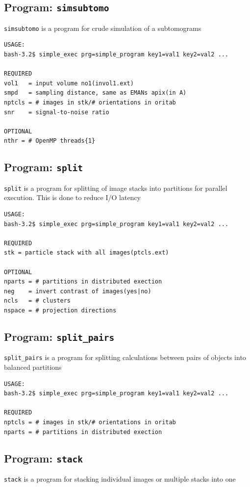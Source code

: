 \documentclass[a4paper,11pt]{article}
\newcommand{\prgname}[1]{\textcolor{NavyBlue}{\texttt{#1}}}
\begin{document}
\subsection{Program: \prgname{simsubtomo}}
\label{simsubtomo}
\prgname{simsubtomo} is a program for crude simulation of a subtomograms

\begin{verbatim}
USAGE:
bash-3.2$ simple_exec prg=simple_program key1=val1 key2=val2 ...

REQUIRED
vol1   = input volume no1(invol1.ext)
smpd   = sampling distance, same as EMANs apix(in A)
nptcls = # images in stk/# orientations in oritab
snr    = signal-to-noise ratio

OPTIONAL
nthr = # OpenMP threads{1}
\end{verbatim}

\subsection{Program: \prgname{split}}
\label{split}
\prgname{split} is a program for splitting of image stacks into partitions for parallel execution. This is done to reduce I/O latency

\begin{verbatim}
USAGE:
bash-3.2$ simple_exec prg=simple_program key1=val1 key2=val2 ...

REQUIRED
stk = particle stack with all images(ptcls.ext)

OPTIONAL
nparts = # partitions in distributed exection
neg    = invert contrast of images(yes|no)
ncls   = # clusters
nspace = # projection directions
\end{verbatim}

\subsection{Program: \prgname{split\_pairs}}
\label{split_pairs}
\prgname{split\_pairs} is a program for splitting calculations between pairs of objects into balanced partitions

\begin{verbatim}
USAGE:
bash-3.2$ simple_exec prg=simple_program key1=val1 key2=val2 ...

REQUIRED
nptcls = # images in stk/# orientations in oritab
nparts = # partitions in distributed exection
\end{verbatim}

\subsection{Program: \prgname{stack}}
\label{stack}
\prgname{stack} is a program for stacking individual images or multiple stacks into one
\end{document}

